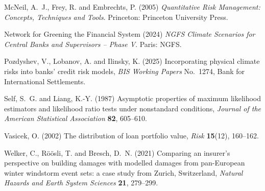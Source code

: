 \begin{thebibliography}{}
McNeil, A.~J., Frey, R. and Embrechts, P. (2005)
\textit{Quantitative Risk Management: Concepts, Techniques and Tools}.
Princeton: Princeton University Press.

Network for Greening the Financial System (2024)
\textit{NGFS Climate Scenarios for Central Banks and Supervisors -- Phase V}.
Paris: NGFS.

Pozdyshev, V., Lobanov, A. and Ilinsky, K. (2025)
Incorporating physical climate risks into banks' credit risk models,
\textit{BIS Working Papers} No.~1274, Bank for International Settlements.

Self, S.~G. and Liang, K.-Y. (1987)
Asymptotic properties of maximum likelihood estimators and likelihood ratio tests under nonstandard conditions,
\textit{Journal of the American Statistical Association} \textbf{82}, 605--610.

Vasicek, O. (2002)
The distribution of loan portfolio value,
\textit{Risk} \textbf{15}(12), 160--162.

Welker, C., R\"o\"osli, T. and Bresch, D.~N. (2021)
Comparing an insurer's perspective on building damages with modelled damages from pan-European winter windstorm event sets: a case study from Zurich, Switzerland,
\textit{Natural Hazards and Earth System Sciences} \textbf{21}, 279--299.

\end{thebibliography}

